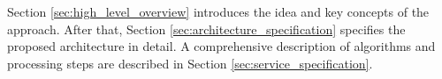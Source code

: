 \documentclass[../../main.tex]{subfiles}
\begin{document}
Section \ref{sec:high_level_overview} introduces the idea and key concepts of the approach. After that, Section \ref{sec:architecture_specification} specifies the proposed architecture in detail. A comprehensive description of algorithms and processing steps are described in Section \ref{sec:service_specification}.








\end{document}
